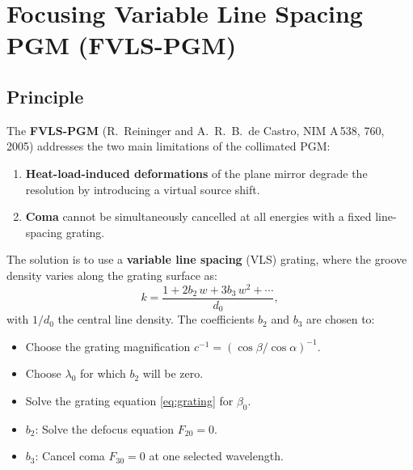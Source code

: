 \documentclass[12pt,a4paper]{article}
\newcommand{\placeholder}[4][\linewidth]{%
  \begin{figure}[H]
    \centering
    \begin{tikzpicture}
      \draw[fill=plbg, draw=plframe, line width=1pt, dashed]
            (0,0) rectangle (#1, #2);
      \draw[plframe, line width=0.4pt] (0,0) -- (#1,#2);
      \draw[plframe, line width=0.4pt] (#1,0) -- (0,#2);
      \node[anchor=north west, font=\small\bfseries\color{plframe},
            inner sep=4pt] at (0,#2) {#3};
      \node[anchor=center, font=\small\itshape\color{pltext},
            text width=0.75\linewidth, align=center]
            at ({0.5*#1},{0.5*#2}) {#4};
    \end{tikzpicture}
  \end{figure}
}
\newcommand{\al}{\alpha}
\newcommand{\be}{\beta}
\begin{document}

\section{Focusing Variable Line Spacing PGM (FVLS-PGM)}

\subsection{Principle}

The \textbf{FVLS-PGM} (R.\ Reininger and A.\ R.\ B.\ de Castro, NIM A\,538, 760, 2005)
addresses the two main limitations of the collimated PGM:

\begin{enumerate}
  \item \textbf{Heat-load-induced deformations} of the plane mirror degrade the resolution
        by introducing a virtual source shift.
  \item \textbf{Coma} cannot be simultaneously cancelled at all energies with a fixed
        line-spacing grating.
\end{enumerate}

The solution is to use a \textbf{variable line spacing} (VLS) grating, where the groove
density varies along the grating surface as:
\begin{equation}
  k = \frac{1 + 2 b_2\,w + 3 b_3\,w^2 + \cdots}{d_0},
  \label{eq:VLS}
\end{equation}
with $1/d_0$ the central line density.  The coefficients $b_2$ and $b_3$
are chosen to:

\begin{itemize}
  \item Choose the grating magnification $c^{-1}=(\cos\be/\cos\al)^{-1}$.
  \item Choose $\lambda_0$ for which $b_2$ will be zero. 
  \item Solve the grating equation \ref{eq:grating} for $\be_0$.
  \item $b_2$: Solve the defocus equation $F_{20} = 0$. 
  \item $b_3$: Cancel coma $F_{30} = 0$ at one selected wavelength.
\end{itemize}
\end{document}
